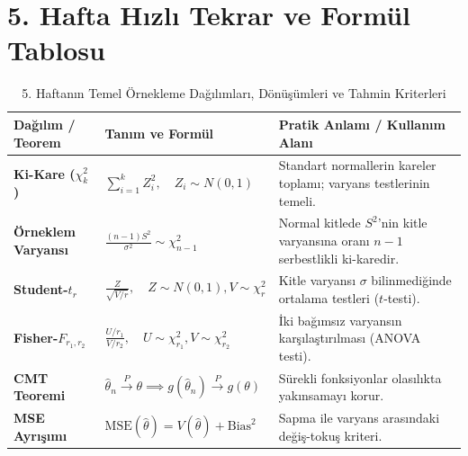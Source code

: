 \documentclass[12pt,a4paper]{article}
\begin{document}
\vspace{0.5em}
\section{5. Hafta Hızlı Tekrar ve Formül Tablosu}

\begin{table}[ht]
\centering
\small
\renewcommand{\arraystretch}{1.35}
\begin{tabularx}{\textwidth}{@{}l l X@{}}
\toprule
\textbf{Dağılım / Teorem} & \textbf{Tanım ve Formül} & \textbf{Pratik Anlamı / Kullanım Alanı} \\ \midrule
\textbf{Ki-Kare ($\chi^2_k$)} & $\sum_{i=1}^k Z_i^2, \quad Z_i \sim N(0,1)$ & Standart normallerin kareler toplamı; varyans testlerinin temeli. \\
\textbf{Örneklem Varyansı} & $\frac{(n-1)S^2}{\sigma^2} \sim \chi^2_{n-1}$ & Normal kitlede $S^2$'nin kitle varyansına oranı $n-1$ serbestlikli ki-karedir. \\
\textbf{Student-$t_r$} & $\frac{Z}{\sqrt{V/r}}, \quad Z \sim N(0,1), V \sim \chi^2_r$ & Kitle varyansı $\sigma$ bilinmediğinde ortalama testleri ($t$-testi). \\
\textbf{Fisher-$F_{r_1, r_2}$} & $\frac{U/r_1}{V/r_2}, \quad U \sim \chi^2_{r_1}, V \sim \chi^2_{r_2}$ & İki bağımsız varyansın karşılaştırılması (ANOVA testi). \\
\textbf{CMT Teoremi} & $\hat{\theta}_n \xrightarrow{P} \theta \implies g(\hat{\theta}_n) \xrightarrow{P} g(\theta)$ & Sürekli fonksiyonlar olasılıkta yakınsamayı korur. \\
\textbf{MSE Ayrışımı} & $\text{MSE}(\hat{\theta}) = V(\hat{\theta}) + \text{Bias}^2$ & Sapma ile varyans arasındaki değiş-tokuş kriteri. \\ \bottomrule
\end{tabularx}
\caption{5. Haftanın Temel Örnekleme Dağılımları, Dönüşümleri ve Tahmin Kriterleri}
\end{table}
\end{document}
